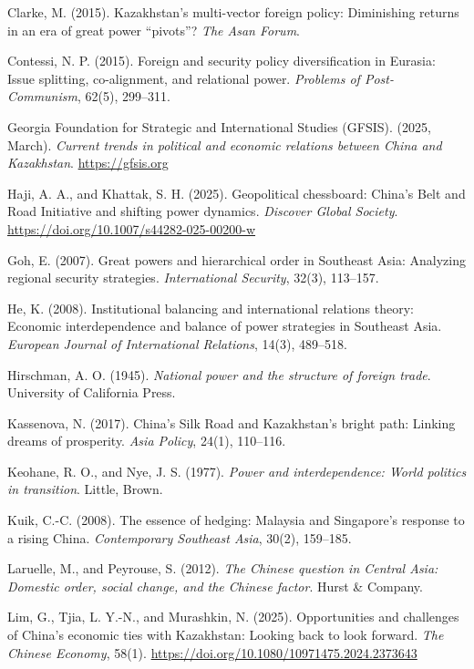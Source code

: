 \documentclass[12pt]{article}
\begin{document}
\noindent Clarke, M. (2015). Kazakhstan's multi-vector foreign policy: Diminishing returns in an era of great power ``pivots''? \textit{The Asan Forum}.

\noindent Contessi, N. P. (2015). Foreign and security policy diversification in Eurasia: Issue splitting, co-alignment, and relational power. \textit{Problems of Post-Communism}, 62(5), 299--311.

\noindent Georgia Foundation for Strategic and International Studies (GFSIS). (2025, March). \textit{Current trends in political and economic relations between China and Kazakhstan}. \url{https://gfsis.org}

\noindent Haji, A. A., and Khattak, S. H. (2025). Geopolitical chessboard: China's Belt and Road Initiative and shifting power dynamics. \textit{Discover Global Society}. \url{https://doi.org/10.1007/s44282-025-00200-w}

\noindent Goh, E. (2007). Great powers and hierarchical order in Southeast Asia: Analyzing regional security strategies. \textit{International Security}, 32(3), 113--157.

\noindent He, K. (2008). Institutional balancing and international relations theory: Economic interdependence and balance of power strategies in Southeast Asia. \textit{European Journal of International Relations}, 14(3), 489--518.

\noindent Hirschman, A. O. (1945). \textit{National power and the structure of foreign trade}. University of California Press.

\noindent Kassenova, N. (2017). China's Silk Road and Kazakhstan's bright path: Linking dreams of prosperity. \textit{Asia Policy}, 24(1), 110--116.

\noindent Keohane, R. O., and Nye, J. S. (1977). \textit{Power and interdependence: World politics in transition}. Little, Brown.

\noindent Kuik, C.-C. (2008). The essence of hedging: Malaysia and Singapore's response to a rising China. \textit{Contemporary Southeast Asia}, 30(2), 159--185.

\noindent Laruelle, M., and Peyrouse, S. (2012). \textit{The Chinese question in Central Asia: Domestic order, social change, and the Chinese factor}. Hurst \& Company.

\noindent Lim, G., Tjia, L. Y.-N., and Murashkin, N. (2025). Opportunities and challenges of China's economic ties with Kazakhstan: Looking back to look forward. \textit{The Chinese Economy}, 58(1). \url{https://doi.org/10.1080/10971475.2024.2373643}
\end{document}

